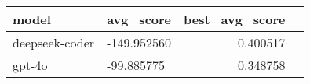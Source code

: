\begin{tabular}{llrr}
\toprule
model & avg_score & best_avg_score \\
\midrule
deepseek-coder & -149.952560 & 0.400517 \\
gpt-4o & -99.885775 & 0.348758 \\
\bottomrule
\end{tabular}